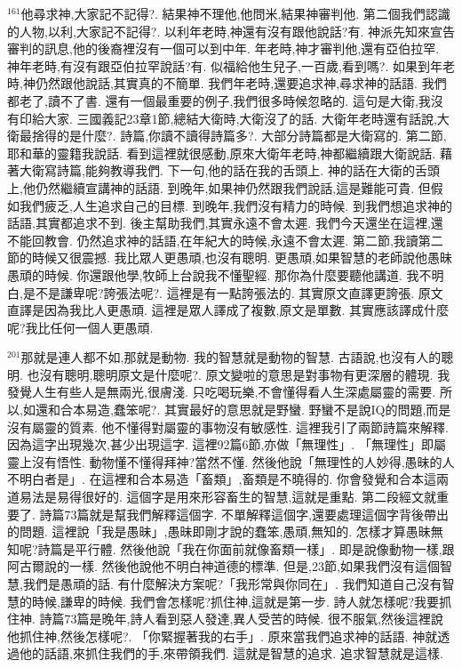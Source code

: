 \documentclass{book}
\begin{document}
$^{161}$他尋求神,大家記不記得?.
結果神不理他,他問米,結果神審判他.
第二個我們認識的人物,以利,大家記不記得?.
以利年老時,神還有沒有跟他說話?有.
神派先知來宣告審判的訊息,他的後裔裡沒有一個可以到中年.
年老時,神才審判他,還有亞伯拉罕.
神年老時,有沒有跟亞伯拉罕說話?有.
似福給他生兒子,一百歲,看到嗎?.
如果到年老時,神仍然跟他說話,其實真的不簡單.
我們年老時,還要追求神,尋求神的話語.
我們都老了,讀不了書.
還有一個最重要的例子,我們很多時候忽略的.
這句是大衛,我沒有印給大家.
三國義記23章1節,總結大衛時,大衛沒了的話.
大衛年老時還有話說,大衛最捨得的是什麼?.
詩篇,你讀不讀得詩篇多?.
大部分詩篇都是大衛寫的.
第二節,耶和華的靈籍我說話.
看到這裡就很感動,原來大衛年老時,神都繼續跟大衛說話.
藉著大衛寫詩篇,能夠教導我們.
下一句,他的話在我的舌頭上.
神的話在大衛的舌頭上,他仍然繼續宣講神的話語.
到晚年,如果神仍然跟我們說話,這是難能可貴.
但假如我們疲乏,人生追求自己的目標.
到晚年,我們沒有精力的時候.
到我們想追求神的話語,其實都追求不到.
後主幫助我們,其實永遠不會太遲.
我們今天還坐在這裡,還不能回教會.
仍然追求神的話語,在年紀大的時候,永遠不會太遲.
第二節,我讀第二節的時候又很震撼.
我比眾人更愚頑,也沒有聰明.
更愚頑,如果智慧的老師說他愚昧愚頑的時候.
你還跟他學,牧師上台說我不懂聖經.
那你為什麼要聽他講道.
我不明白,是不是謙卑呢?誇張法呢?.
這裡是有一點誇張法的.
其實原文直譯更誇張.
原文直譯是因為我比人更愚頑.
這裡是眾人譯成了複數,原文是單數.
其實應該譯成什麼呢?我比任何一個人更愚頑.

$^{201}$那就是連人都不如,那就是動物.
我的智慧就是動物的智慧.
古語說,也沒有人的聰明.
也沒有聰明,聰明原文是什麼呢?.
原文變啦的意思是對事物有更深層的體現.
我發覺人生有些人是無兩光,很膚淺.
只吃喝玩樂,不會懂得看人生深處屬靈的需要.
所以,如還和合本易造,蠢笨呢?.
其實最好的意思就是野蠻.
野蠻不是說IQ的問題,而是沒有屬靈的質素.
他不懂得對屬靈的事物沒有敏感性.
這裡我引了兩節詩篇來解釋.
因為這字出現幾次,甚少出現這字.
這裡92篇6節,亦做「無理性」.
「無理性」即屬靈上沒有悟性.
動物懂不懂得拜神?當然不懂.
然後他說「無理性的人妙得,愚昧的人不明白者是」.
在這裡和合本易造「畜類」,畜類是不曉得的.
你會發覺和合本這兩道易法是易得很好的.
這個字是用來形容畜生的智慧,這就是重點.
第二段經文就重要了.
詩篇73篇就是幫我們解釋這個字.
不單解釋這個字,還要處理這個字背後帶出的問題.
這裡說「我是愚昧」,愚昧即剛才說的蠢笨,愚頑,無知的.
怎樣才算愚昧無知呢?詩篇是平行體.
然後他說「我在你面前就像畜類一樣」.
即是說像動物一樣,跟阿古爾說的一樣.
然後他說他不明白神道德的標準.
但是,23節,如果我們沒有這個智慧,我們是愚頑的話.
有什麼解決方案呢?「我形常與你同在」.
我們知道自己沒有智慧的時候,謙卑的時候.
我們會怎樣呢?抓住神,這就是第一步.
詩人就怎樣呢?我要抓住神.
詩篇73篇是晚年,詩人看到惡人發達,異人受苦的時候.
很不服氣,然後這裡說他抓住神,然後怎樣呢?.
「你緊握著我的右手」.
原來當我們追求神的話語.
神就透過他的話語,來抓住我們的手,來帶領我們.
這就是智慧的追求.
追求智慧就是這樣.
\end{document}
